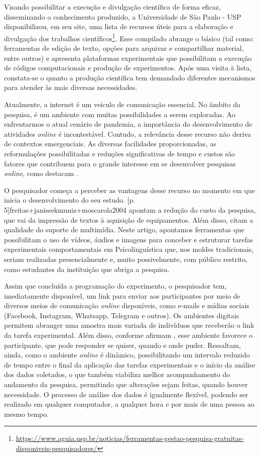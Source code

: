 \documentclass{textolivre}
\begin{document}
Visando possibilitar a execução e divulgação científica de forma eficaz, disseminando o conhecimento produzido, a Universidade de São Paulo - USP disponibilizou, em seu site, uma lista de recursos úteis para a elaboração e divulgação dos trabalhos científicos\footnote{\url{https://www.aguia.usp.br/noticias/ferramentas-gestao-pesquisa-gratuitas-disponiveis-pesquisadores/}}. Esse compilado abrange o básico (tal como: ferramentas de edição de texto, opções para arquivar e compartilhar material, entre outros) e apresenta plataformas experimentais que possibilitam a execução de códigos computacionais e produção de experimentos. Após uma visita à lista, constata-se o quanto a produção científica tem demandado diferentes mecanismos para atender às mais diversas necessidades.

Atualmente, a internet é um veículo de comunicação essencial. No âmbito da pesquisa, é um ambiente com muitas possibilidades a serem exploradas. Ao enfrentarmos o atual cenário de pandemia, a importância do desenvolvimento de atividades \textit{online} é incontestável. Contudo, a relevância desse recurso não deriva de contextos emergenciais. As diversas facilidades proporcionadas, as reformulações possibilitadas e reduções significativas de tempo e custos são fatores que contribuem para o grande interesse em se desenvolver pesquisas \textit{online}, como destacam \textcite[p. 3]{freitasetal2004}.

O pesquisador começa a perceber as vantagens desse recurso no momento em que inicia o desenvolvimento do seu estudo. [p. 5]{freitas+janissekmuniz+moscarola2004} apontam a redução do custo da pesquisa, que vai da impressão de textos à aquisição de equipamentos. Além disso, citam a qualidade do suporte de multimídia. Neste artigo, apontamos ferramentas que possibilitam o uso de vídeos, áudios e imagens para conceber e estruturar tarefas experimentais comportamentais em Psicolinguística que, nos moldes tradicionais, seriam realizadas presencialmente e, muito possivelmente, com público restrito, como estudantes da instituição que abriga a pesquisa.

Assim que concluída a programação do experimento, o pesquisador tem, imediatamente disponível, um link para enviar aos participantes por meio de diversos meios de comunicação \textit{online} disponíveis, como e-mails e mídias sociais (Facebook, Instagram, Whatsapp, Telegram e outros). Os ambientes digitais permitem abranger uma amostra mais variada de indivíduos que receberão o link da tarefa experimental. Além disso, conforme afirmam \textcite[p. 4]{freitas+janissekmuniz+moscarola2004}, esse ambiente favorece o participante, que pode responder se quiser, quando e onde puder. Ressaltam, ainda, como o ambiente \textit{online} é dinâmico, possibilitando um intervalo reduzido de tempo entre o final da aplicação das tarefas experimentais e o início da análise dos dados coletados, o que também viabiliza melhor acompanhamento do andamento da pesquisa, permitindo que alterações sejam feitas, quando houver necessidade. O processo de análise dos dados é igualmente flexível, podendo ser realizado em qualquer computador, a qualquer hora e por mais de uma pessoa ao mesmo tempo.
\end{document}
